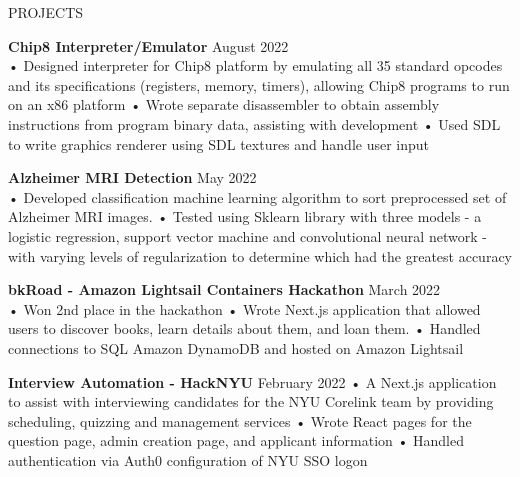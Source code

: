 \documentclass{resume} %
\begin{document}
\begin{rSection}{PROJECTS}

\textbf{\bf Chip8 Interpreter/Emulator } \hfill August 2022 \\
• Designed interpreter for Chip8 platform by emulating all 35 standard opcodes and its specifications (registers, memory, timers), allowing Chip8 programs to run on an x86 platform \newline
• Wrote separate disassembler to obtain assembly instructions from program binary data, assisting with development  \newline
• Used SDL to write graphics renderer using SDL textures and handle user input \smallskip



\textbf{\bf Alzheimer MRI Detection } \hfill May 2022 \\
• Developed classification machine learning algorithm to sort preprocessed set of Alzheimer MRI images. 
\newline
• Tested using Sklearn library with three models - a logistic regression, support vector machine and convolutional neural network - with varying levels of regularization to determine which had the greatest accuracy 

\textbf{\bf bkRoad - Amazon Lightsail Containers Hackathon } \hfill March 2022 \\
• Won 2nd place in the hackathon \newline
• Wrote Next.js application that allowed users to discover books, learn details about them, and loan them. \newline
• Handled connections to SQL Amazon DynamoDB and hosted on Amazon Lightsail

\textbf{\bf Interview Automation - HackNYU} \hfill February 2022 \newline
• A Next.js application to assist with interviewing candidates for the NYU Corelink team by providing scheduling, quizzing and management services\newline
• Wrote React pages for the question page, admin creation page, and applicant information \newline
• Handled authentication via Auth0 configuration of NYU SSO logon


\end{rSection}
\end{document}
